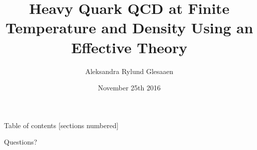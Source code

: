 \documentclass[11pt]{beamer}
\author{Aleksandra Rylund Glesaaen}
\title{Heavy Quark QCD at Finite Temperature and Density Using an Effective Theory}
\institute{Goethe University Frankfurt}
\date{November 25th 2016}
\begin{document}
\maketitle

\begin{frame}{Table of contents}
  [sections numbered]
  \tableofcontents[hideallsubsections]
\end{frame}






\begin{frame}[standout]
  Questions?
\end{frame}


\end{document}
